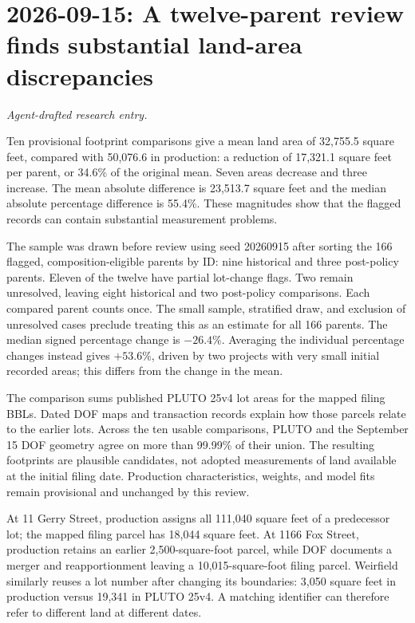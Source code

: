 \clearpage
\section*{2026-09-15: A twelve-parent review finds substantial land-area discrepancies}
\textit{Agent-drafted research entry.}

Ten provisional footprint comparisons give a mean land area of 32,755.5 square
feet, compared with 50,076.6 in production: a reduction of 17,321.1 square feet
per parent, or 34.6\% of the original mean. Seven areas decrease and three
increase. The mean absolute difference is 23,513.7 square feet and the median
absolute percentage difference is 55.4\%. These magnitudes show that the
flagged records can contain substantial measurement problems.

The sample was drawn before review using seed 20260915 after sorting the 166
flagged, composition-eligible parents by ID: nine historical and three
post-policy parents. Eleven of the twelve have partial lot-change flags.
Two remain unresolved, leaving eight historical and two post-policy comparisons.
Each compared parent counts once. The small sample, stratified draw, and
exclusion of unresolved cases preclude treating this as an estimate for all
166 parents. The median signed percentage change is $-26.4\%$. Averaging the
individual percentage changes instead gives $+53.6\%$, driven by two projects
with very small initial recorded areas; this differs from the change in the mean.

The comparison sums published PLUTO 25v4 lot areas for the mapped filing BBLs.
Dated DOF maps and transaction records explain how those parcels relate to the
earlier lots. Across the ten usable comparisons, PLUTO and the September 15
DOF geometry agree on more than 99.99\% of their union. The resulting footprints
are plausible candidates, not adopted measurements of land available at the
initial filing date. Production characteristics, weights, and model fits remain
provisional and unchanged by this review.

At 11 Gerry Street, production assigns all 111,040 square feet of a predecessor
lot; the mapped filing parcel has 18,044 square feet. At 1166 Fox Street,
production retains an earlier 2,500-square-foot parcel, while DOF documents a
merger and reapportionment leaving a 10,015-square-foot filing parcel. Weirfield
similarly reuses a lot number after changing its boundaries: 3,050 square feet
in production versus 19,341 in PLUTO 25v4. A matching identifier can therefore
refer to different land at different dates.

